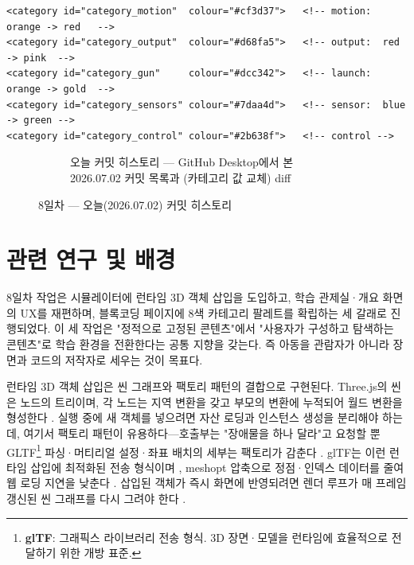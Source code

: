 \begin{verbatim}
<category id="category_motion"  colour="#cf3d37">   <!-- motion:  orange -> red   -->
<category id="category_output"  colour="#d68fa5">   <!-- output:  red    -> pink  -->
<category id="category_gun"     colour="#dcc342">   <!-- launch:  orange -> gold  -->
<category id="category_sensors" colour="#7daa4d">   <!-- sensor:  blue   -> green -->
<category id="category_control" colour="#2b638f">   <!-- control -->
\end{verbatim}

\begin{figure}[htbp]\centering
  \begin{subfigure}{0.82\linewidth}\centering
    \caption{오늘 커밋 히스토리 — GitHub Desktop에서 본 2026.07.02 커밋 목록과 (카테고리  값 교체) diff}
  \end{subfigure}
  \caption{8일차 — 오늘(2026.07.02) 커밋 히스토리}
\end{figure}



\section{관련 연구 및 배경}

8일차 작업은 시뮬레이터에 런타임 3D 객체 삽입을 도입하고, 학습 관제실·개요 화면의 UX를 재편하며, 블록코딩 페이지에 8색 카테고리 팔레트를 확립하는 세 갈래로 진행되었다. 이 세 작업은 "정적으로 고정된 콘텐츠"에서 "사용자가 구성하고 탐색하는 콘텐츠"로 학습 환경을 전환한다는 공통 지향을 갖는다. 즉 아동을 관람자가 아니라 장면과 코드의 저작자로 세우는 것이 목표다.

런타임 3D 객체 삽입은 씬 그래프와 팩토리 패턴의 결합으로 구현된다. Three.js의 씬은 노드의 트리이며, 각 노드는 지역 변환을 갖고 부모의 변환에 누적되어 월드 변환을 형성한다 \cite{threejs}. 실행 중에 새 객체를 넣으려면 자산 로딩과 인스턴스 생성을 분리해야 하는데, 여기서 팩토리 패턴이 유용하다—호출부는 "장애물을 하나 달라"고 요청할 뿐 GLTF\footnote{\textbf{glTF}: 그래픽스 라이브러리 전송 형식. 3D 장면·모델을 런타임에 효율적으로 전달하기 위한 개방 표준.} 파싱·머티리얼 설정·좌표 배치의 세부는 팩토리가 감춘다 \cite{gof1994}. glTF는 이런 런타임 삽입에 최적화된 전송 형식이며 \cite{gltf}, meshopt 압축으로 정점·인덱스 데이터를 줄여 웹 로딩 지연을 낮춘다 \cite{meshopt}. 삽입된 객체가 즉시 화면에 반영되려면 렌더 루프가 매 프레임 갱신된 씬 그래프를 다시 그려야 한다 \cite{webgl}.

